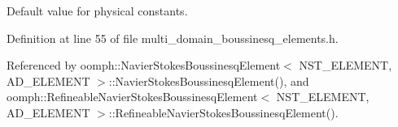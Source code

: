 Default value for physical constants. 



Definition at line 55 of file multi\+\_\+domain\+\_\+boussinesq\+\_\+elements.\+h.



Referenced by oomph\+::\+Navier\+Stokes\+Boussinesq\+Element$<$ N\+S\+T\+\_\+\+E\+L\+E\+M\+E\+N\+T, A\+D\+\_\+\+E\+L\+E\+M\+E\+N\+T $>$\+::\+Navier\+Stokes\+Boussinesq\+Element(), and oomph\+::\+Refineable\+Navier\+Stokes\+Boussinesq\+Element$<$ N\+S\+T\+\_\+\+E\+L\+E\+M\+E\+N\+T, A\+D\+\_\+\+E\+L\+E\+M\+E\+N\+T $>$\+::\+Refineable\+Navier\+Stokes\+Boussinesq\+Element().

